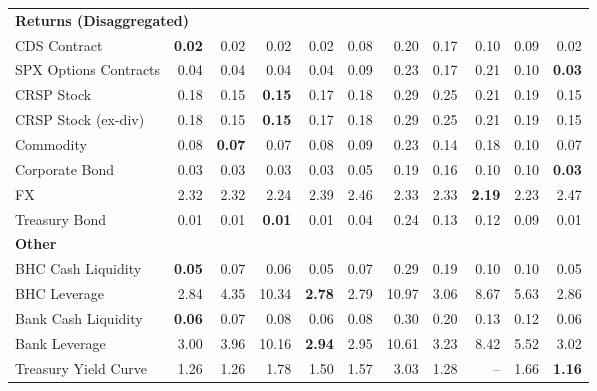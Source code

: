 \begin{table}[htbp]
\begin{tabular}{@{}lrrrrrrrrrr@{}}
\midrule
\multicolumn{11}{l}{\textbf{Returns (Disaggregated)}} \\
CDS Contract & \textbf{0.02} & 0.02 & 0.02 & 0.02 & 0.08 & 0.20 & 0.17 & 0.10 & 0.09 & 0.02 \\
SPX Options Contracts & 0.04 & 0.04 & 0.04 & 0.04 & 0.09 & 0.23 & 0.17 & 0.21 & 0.10 & \textbf{0.03} \\
CRSP Stock & 0.18 & 0.15 & \textbf{0.15} & 0.17 & 0.18 & 0.29 & 0.25 & 0.21 & 0.19 & 0.15 \\
CRSP Stock (ex-div) & 0.18 & 0.15 & \textbf{0.15} & 0.17 & 0.18 & 0.29 & 0.25 & 0.21 & 0.19 & 0.15 \\
Commodity & 0.08 & \textbf{0.07} & 0.07 & 0.08 & 0.09 & 0.23 & 0.14 & 0.18 & 0.10 & 0.07 \\
Corporate Bond & 0.03 & 0.03 & 0.03 & 0.03 & 0.05 & 0.19 & 0.16 & 0.10 & 0.10 & \textbf{0.03} \\
FX & 2.32 & 2.32 & 2.24 & 2.39 & 2.46 & 2.33 & 2.33 & \textbf{2.19} & 2.23 & 2.47 \\
Treasury Bond & 0.01 & 0.01 & \textbf{0.01} & 0.01 & 0.04 & 0.24 & 0.13 & 0.12 & 0.09 & 0.01 \\
\midrule
\multicolumn{11}{l}{\textbf{Other}} \\
BHC Cash Liquidity & \textbf{0.05} & 0.07 & 0.06 & 0.05 & 0.07 & 0.29 & 0.19 & 0.10 & 0.10 & 0.05 \\
BHC Leverage & 2.84 & 4.35 & 10.34 & \textbf{2.78} & 2.79 & 10.97 & 3.06 & 8.67 & 5.63 & 2.86 \\
Bank Cash Liquidity & \textbf{0.06} & 0.07 & 0.08 & 0.06 & 0.08 & 0.30 & 0.20 & 0.13 & 0.12 & 0.06 \\
Bank Leverage & 3.00 & 3.96 & 10.16 & \textbf{2.94} & 2.95 & 10.61 & 3.23 & 8.42 & 5.52 & 3.02 \\
Treasury Yield Curve & 1.26 & 1.26 & 1.78 & 1.50 & 1.57 & 3.03 & 1.28 & -- & 1.66 & \textbf{1.16} \\
\bottomrule
\end{tabular}
\vspace{0.1cm}

\end{table}
